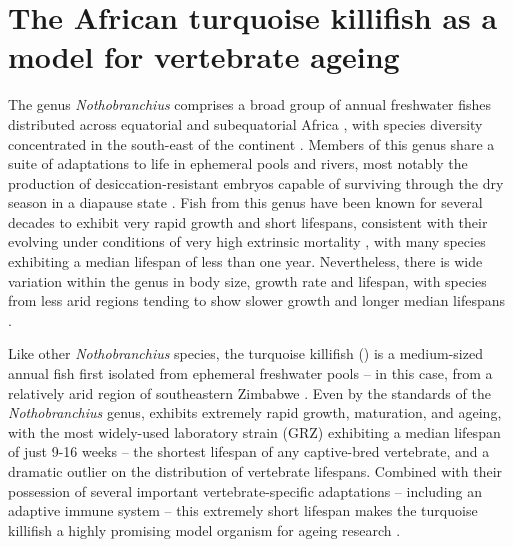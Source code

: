\section{The African turquoise killifish as a model for vertebrate ageing}
%
%
%
The genus \textit{Nothobranchius} comprises a broad group of annual freshwater fishes distributed across equatorial and subequatorial Africa \parencite{valdesalici2003lifespan}, with species diversity concentrated in the south-east of the continent \parencite{genade2005annual}. Members of this genus share a suite of adaptations to life in ephemeral pools and rivers, most notably the production of desiccation-resistant embryos capable of surviving through the dry season in a diapause state \citep{genade2005annual}. Fish from this genus have been known for several decades to exhibit very rapid growth and short lifespans, consistent with their evolving under conditions of very high extrinsic mortality \parencite{valdesalici2003lifespan}, with many species exhibiting a median lifespan of less than one year. Nevertheless, there is wide variation within the genus in body size, growth rate and lifespan, with species from less arid regions tending to show slower growth and longer median lifespans \parencite{genade2005annual}.

Like other \textit{Nothobranchius} species, the turquoise killifish (\nfu) is a medium-sized annual fish first isolated from ephemeral freshwater pools -- in this case, from a relatively arid region of southeastern Zimbabwe \parencite{jubb1971new,genade2005annual}. Even by the standards of the \textit{Nothobranchius} genus, \Nfu exhibits extremely rapid growth, maturation, and ageing, with the most widely-used laboratory strain (GRZ) exhibiting a median lifespan of just 9-16 weeks \parencite{valdesalici2003lifespan,genade2005annual,terzibasi2008strains,kirschner2012map,valenzano2015genome,smith2017microbiota} -- the shortest lifespan of any captive-bred vertebrate, and a dramatic outlier on the distribution of vertebrate lifespans. %
Combined with their possession of several important vertebrate-specific adaptations -- including an adaptive immune system -- this extremely short lifespan makes the turquoise killifish a highly promising model organism for ageing research \parencite{harel2015crispr}.

